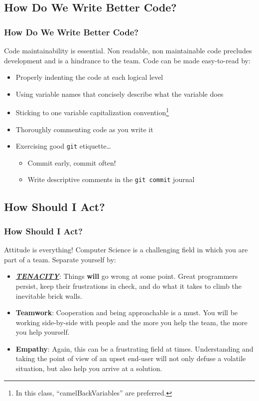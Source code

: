 \documentclass[aspectratio=169]{beamer}
\begin{document}
\subsection{How Do We Write Better Code?}
\begin{frame}
\frametitle{How Do We Write Better Code?}
Code maintainability is essential. Non readable, non maintainable code precludes development and is a hindrance to the team. Code can be made easy-to-read by:
\begin{itemize}
	\item Properly indenting the code at each logical level
	\item Using variable names that concisely describe what the variable does
	\item Sticking to one variable capitalization convention\footnote{In this class, ``camelBackVariables'' are preferred.}
	\item Thoroughly commenting code as you write it
	\item Exercising good \texttt{git} etiquette\dots
	\pause
	\begin{itemize}
		\item Commit early, commit often!
		\item Write descriptive comments in the \texttt{git commit} journal
	\end{itemize}
\end{itemize}
\end{frame}

\subsection{How Should I Act?}
\begin{frame}
\frametitle{How Should I Act?}
Attitude is everything! Computer Science is a challenging field in which you are part of a team. Separate yourself by:
\begin{itemize}
	\item \textbf{\underline{\emph{TENACITY}}}: Things \textbf{will} go wrong at some point. Great programmers persist, keep their frustrations in check, and do what it takes to climb the inevitable brick walls.
	\item \textbf{Teamwork}: Cooperation and being approachable is a must. You will be working side-by-side with people and the more you help the team, the more you help yourself.
	\item \textbf{Empathy}: Again, this can be a frustrating field at times. Understanding and taking the point of view of an upset end-user will not only defuse a volatile situation, but also help you arrive at a solution.
\end{itemize}
\end{frame}
\end{document}
